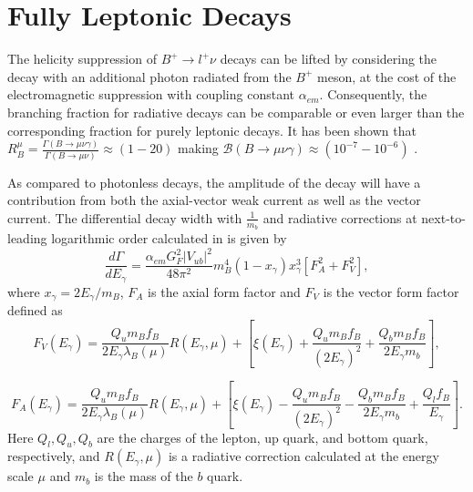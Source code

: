 \section{Fully Leptonic  Decays}
\label{lnugamma}
The helicity suppression of $B^{+}\rightarrow l^{+} \nu$ decays can be lifted by considering the decay with an additional photon radiated from the $B^{+}$ meson, at the cost of the electromagnetic suppression with coupling constant $\alpha_{em}$. Consequently, the branching fraction for radiative decays can be comparable or even larger than the corresponding fraction for purely leptonic decays. It has been shown that $R^{\mu}_{B}=\frac{\Gamma(B\rightarrow \mu \nu \gamma)}{\Gamma(B\rightarrow \mu \nu)}\approx(1-20)$ making $\mathcal{B}(B\rightarrow \mu \nu \gamma)\approx(10^{-7}-10^{-6})$ \cite{Burdman:1994ip}.

As compared to photonless decays, the amplitude of the decay will have a contribution from both the axial-vector weak current as well as the vector current.
The differential decay width with $\frac{1}{m_{b}}$ and radiative corrections
at next-to-leading logarithmic order calculated in\cite{Beneke:2011nf} is given by
\begin{equation}
\frac{d\Gamma}{dE_{\gamma}} = \frac{\alpha_{em}G^{2}_{F}|V_{ub}|^{2}}{48 \pi^{2}}m_{B}^{4}(1 - x_{\gamma})x_{\gamma}^{3}[F_A^{2} + F_V^{2}],
\end{equation}
 where $x_{\gamma} = 2E_{\gamma}/m_{B}$, $F_A$ is the axial form factor and $F_V$  is the vector form factor defined as
\begin{equation}
F_{V}(E_{\gamma}) = \frac{Q_{u}m_{B}f_{B}}{2E_{\gamma}\lambda_{B}(\mu)} R(E_{\gamma}, \mu) + [\xi(E_\gamma) +  \frac{Q_{u}m_{B}f_{B}}{(2E_{\gamma})^{2}} + \frac{Q_{b}m_{B}f_{B}}{2E_{\gamma}m_{b}}],
\label{eq:top1}
\end{equation}

\begin{equation}
F_{A}(E_{\gamma}) = \frac{Q_{u}m_{B}f_{B}}{2E_{\gamma}\lambda_{B}(\mu)} R(E_{\gamma}, \mu) + [\xi(E_\gamma) -  \frac{Q_{u}m_{B}f_{B}}{(2E_{\gamma})^{2}} - \frac{Q_{b}m_{B}f_{B}}{2E_{\gamma}m_{b}} + \frac{Q_{l}f_{B}}{E_{\gamma}}].
\label{eq:top2}
\end{equation}
Here $Q_{l},Q_{u},Q_{b}$ are the charges of the lepton, up quark, and
bottom quark, respectively, and $R(E_{\gamma}, \mu)$ is a radiative correction
calculated at the energy scale $\mu$ %
and $m_{b}$ is the mass of the $b$ quark.

